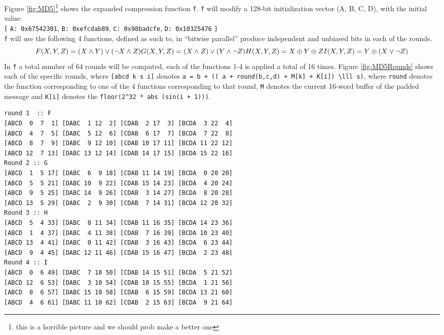 \documentclass[a4paper]{article}
\begin{document}
Figure \ref{fig:MD5}\footnote{this is a horrible picture and we should prob make a better one} shows the expanded compression function \texttt{f}. \texttt{f} will modify a 128-bit initialization vector (A, B, C, D), with the initial value:\\
\texttt{[} \texttt{A: 0x67542301}, \texttt{B: 0xefcdab89}, \texttt{C: 0x98badcfe}, \texttt{D: 0x10325476} \texttt{]}\\
\texttt{f} will use the following 4 functions, defined as such to, in ``bitwise parallel'' produce independent and unbiased bits in each of the rounds.
\begin{equation}
F(X, Y, Z) = (X \wedge Y) \vee (\neg X \wedge Z) \\
G(X, Y, Z) = (X \wedge Z) \vee (Y \wedge \neg Z) \\
H(X, Y, Z) = X \oplus Y \oplus Z \\
I(X, Y, Z) = Y \oplus ( X \vee \neg Z) \\
\end{equation}
In \texttt{f} a total number of 64 rounds will be computed, each of the functions 1-4 is applied a total of 16 times. Figure \ref{fig:MD5Rounds} shows each of the specific rounds, where \texttt{[abcd k s i]} denotes \texttt{a = b + (( a + round(b,c,d) + M[k] + K[i]) \textbackslash{}lll s)}, where \texttt{round} denotes the function corresponding to one of the 4 functions corresponding to that round, \texttt{M} denotes the current 16-word buffer of the padded message and \texttt{K[i]} denotes the \texttt{floor(2\textasciicircum{}32 * abs (sin(i + 1)))}.
\begin{verbatim}
round 1  :: F
[ABCD  0  7  1] [DABC  1 12  2] [CDAB  2 17  3] [BCDA  3 22  4]
[ABCD  4  7  5] [DABC  5 12  6] [CDAB  6 17  7] [BCDA  7 22  8]
[ABCD  8  7  9] [DABC  9 12 10] [CDAB 10 17 11] [BCDA 11 22 12]
[ABCD 12  7 13] [DABC 13 12 14] [CDAB 14 17 15] [BCDA 15 22 16]
Round 2 :: G
[ABCD  1  5 17] [DABC  6  9 18] [CDAB 11 14 19] [BCDA  0 20 20]
[ABCD  5  5 21] [DABC 10  9 22] [CDAB 15 14 23] [BCDA  4 20 24]
[ABCD  9  5 25] [DABC 14  9 26] [CDAB  3 14 27] [BCDA  8 20 28]
[ABCD 13  5 29] [DABC  2  9 30] [CDAB  7 14 31] [BCDA 12 20 32]
Round 3 :: H
[ABCD  5  4 33] [DABC  8 11 34] [CDAB 11 16 35] [BCDA 14 23 36]
[ABCD  1  4 37] [DABC  4 11 38] [CDAB  7 16 39] [BCDA 10 23 40]
[ABCD 13  4 41] [DABC  0 11 42] [CDAB  3 16 43] [BCDA  6 23 44]
[ABCD  9  4 45] [DABC 12 11 46] [CDAB 15 16 47] [BCDA  2 23 48]
Round 4 :: I
[ABCD  0  6 49] [DABC  7 10 50] [CDAB 14 15 51] [BCDA  5 21 52]
[ABCD 12  6 53] [DABC  3 10 54] [CDAB 10 15 55] [BCDA  1 21 56]
[ABCD  8  6 57] [DABC 15 10 58] [CDAB  6 15 59] [BCDA 13 21 60]
[ABCD  4  6 61] [DABC 11 10 62] [CDAB  2 15 63] [BCDA  9 21 64]
\end{verbatim}
\end{document}
